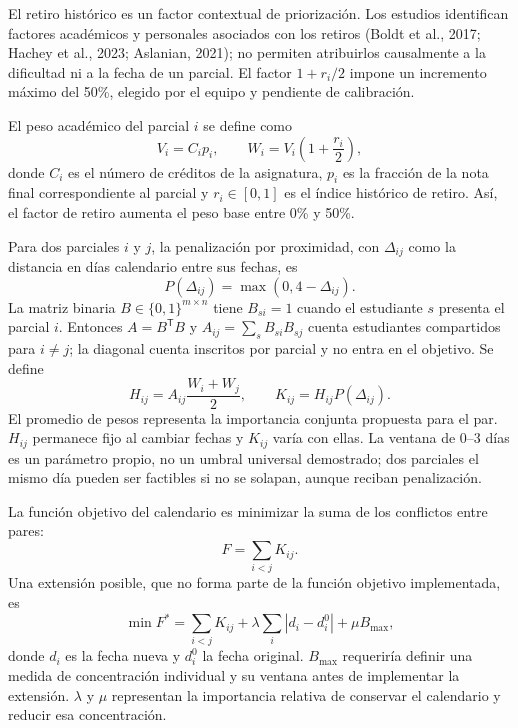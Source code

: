 \documentclass[12pt,letterpaper]{article}
\begin{document}
El retiro histórico es un factor contextual de priorización. Los estudios identifican factores académicos y personales asociados con los retiros (Boldt et al., 2017; Hachey et al., 2023; Aslanian, 2021); no permiten atribuirlos causalmente a la dificultad ni a la fecha de un parcial. El factor $1+r_i/2$ impone un incremento máximo del 50\%, elegido por el equipo y pendiente de calibración.

El peso académico del parcial $i$ se define como
\begin{equation}
  V_i=C_i p_i, \qquad W_i = V_i\left(1+\frac{r_i}{2}\right),
\end{equation}
donde $C_i$ es el número de créditos de la asignatura, $p_i$ es la fracción de la nota final correspondiente al parcial y $r_i\in[0,1]$ es el índice histórico de retiro. Así, el factor de retiro aumenta el peso base entre 0\% y 50\%.

Para dos parciales $i$ y $j$, la penalización por proximidad, con $\Delta_{ij}$ como la distancia en días calendario entre sus fechas, es
\begin{equation}
  P(\Delta_{ij}) = \max(0,4-\Delta_{ij}).
\end{equation}
La matriz binaria $B\in\{0,1\}^{m\times n}$ tiene $B_{si}=1$ cuando el estudiante $s$ presenta el parcial $i$. Entonces $A=B^{\mathsf T}B$ y $A_{ij}=\sum_s B_{si}B_{sj}$ cuenta estudiantes compartidos para $i\ne j$; la diagonal cuenta inscritos por parcial y no entra en el objetivo. Se define
\begin{equation}
 H_{ij}=A_{ij}\frac{W_i+W_j}{2},\qquad K_{ij}=H_{ij}P(\Delta_{ij}).
\end{equation}
El promedio de pesos representa la importancia conjunta propuesta para el par. $H_{ij}$ permanece fijo al cambiar fechas y $K_{ij}$ varía con ellas. La ventana de 0--3 días es un parámetro propio, no un umbral universal demostrado; dos parciales el mismo día pueden ser factibles si no se solapan, aunque reciban penalización.

La función objetivo del calendario es minimizar la suma de los conflictos entre pares:
\begin{equation}
  F = \sum_{i<j} K_{ij}.
\end{equation}
Una extensión posible, que no forma parte de la función objetivo implementada, es
\begin{equation}
  \min F^* = \sum_{i<j}K_{ij} + \lambda\sum_i|d_i-d_i^0| + \mu B_{\max},
\end{equation}
donde $d_i$ es la fecha nueva y $d_i^0$ la fecha original. $B_{\max}$ requeriría definir una medida de concentración individual y su ventana antes de implementar la extensión. $\lambda$ y $\mu$ representan la importancia relativa de conservar el calendario y reducir esa concentración.
\end{document}
